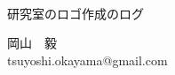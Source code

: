 \documentclass[uplatex,dvipdfmx]{jsarticle}
\begin{document}
\begin{titlepage}
  \noindent %
  \\ \\ \\ \\ \\ \\ \\ \\ 
  \begin{center}
  \begin{LARGE}
  
    研究室のロゴ作成のログ

  \end{LARGE}
  \end{center}
  \vspace{7cm}
  \begin{center}
  \begin{LARGE}
  岡山　毅\\
  tsuyoshi.okayama@gmail.com
  \end{LARGE}
  \end{center}
\end{titlepage}
\newpage

\tableofcontents
\newpage
\end{document}
